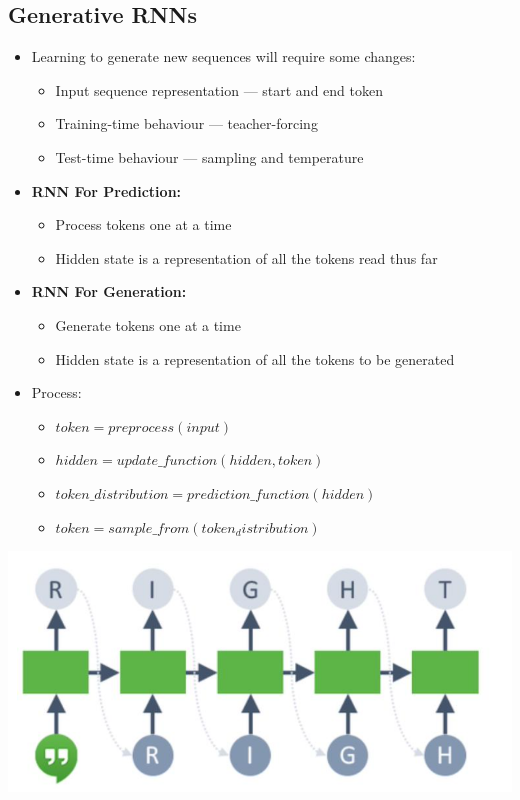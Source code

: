 \documentclass[11pt]{article}
\begin{document}
\subsection{Generative RNNs}
\begin{itemize}
\item Learning to generate new sequences will require some changes:
\begin{itemize}
\item Input sequence representation --- start and end token
\item Training-time behaviour --- teacher-forcing
\item Test-time behaviour --- sampling and temperature
\end{itemize}
\item\textbf{ RNN For Prediction:}
\begin{itemize}
\item Process tokens one at a time
\item Hidden state is a representation of all the tokens read thus far
\end{itemize}
\item \textbf{RNN For Generation:}
\begin{itemize}
\item Generate tokens one at a time
\item Hidden state is a representation of all the tokens to be generated
\end{itemize}
\end{itemize}
\begin{itemize}
\item Process:
\begin{itemize}
\item $token = preprocess (input)$
\item $hidden = update\_function (hidden, token)$
\item $token\_distribution = prediction\_function (hidden)$
\item $token = sample\_from (token_distribution)$
\end{itemize}
\end{itemize}
\begin{center}
\includegraphics[scale=0.6]{images/gen.png}
\end{center}
\end{document}
